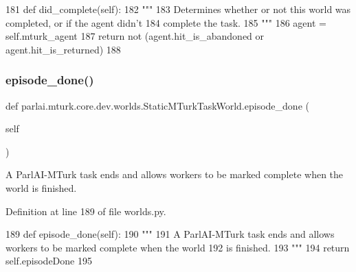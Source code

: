 \begin{DoxyCode}
181     \textcolor{keyword}{def }did\_complete(self):
182         \textcolor{stringliteral}{"""}
183 \textcolor{stringliteral}{        Determines whether or not this world was completed, or if the agent didn't}
184 \textcolor{stringliteral}{        complete the task.}
185 \textcolor{stringliteral}{        """}
186         agent = self.mturk\_agent
187         \textcolor{keywordflow}{return} \textcolor{keywordflow}{not} (agent.hit\_is\_abandoned \textcolor{keywordflow}{or} agent.hit\_is\_returned)
188 
\end{DoxyCode}
\mbox{\label{classparlai_1_1mturk_1_1core_1_1dev_1_1worlds_1_1StaticMTurkTaskWorld_af6460dcb2a232ba0bd7ebfe8d386f5b6}} 
\subsubsection{\texorpdfstring{episode\+\_\+done()}{episode\_done()}}
{\footnotesize\ttfamily def parlai.\+mturk.\+core.\+dev.\+worlds.\+Static\+M\+Turk\+Task\+World.\+episode\+\_\+done (\begin{DoxyParamCaption}\item[{}]{self }\end{DoxyParamCaption})}

\begin{DoxyVerb}A ParlAI-MTurk task ends and allows workers to be marked complete when the world
is finished.
\end{DoxyVerb}
 

Definition at line 189 of file worlds.\+py.


\begin{DoxyCode}
189     \textcolor{keyword}{def }episode\_done(self):
190         \textcolor{stringliteral}{"""}
191 \textcolor{stringliteral}{        A ParlAI-MTurk task ends and allows workers to be marked complete when the world}
192 \textcolor{stringliteral}{        is finished.}
193 \textcolor{stringliteral}{        """}
194         \textcolor{keywordflow}{return} self.episodeDone
195 
\end{DoxyCode}
\mbox{\label{classparlai_1_1mturk_1_1core_1_1dev_1_1worlds_1_1StaticMTurkTaskWorld_a59a7b6fb3eea25c079ac36006311e1a0}} 
